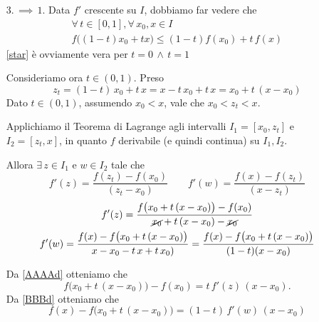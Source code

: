 {\begin{itemize}
    Allora abbiamo che \begin{gather*}
        f'(x_0)\le \frac{f(x)-f(x_0)}{x-x_0}\\
        f(x_0)-f(x)\ge f'(x)(x_0-x) \,\implies\, f(x)-f(x_0)\le f'(x)(x-x_0).
    \end{gather*}
    Otteniamo quindi, dalla seconda equazione: \begin{gather*}
        f'(x)\ge \frac{f(x)-f(x_0)}{x-x_0}\\
        f'(x_0)\le \frac{f(x)-f(x_0)}{x-x_0}\le f'(x).
    \end{gather*}
    
    
    Allora per $ x<x_0 $ generico in $ I $ si ha \[
        f'(x_0)\le f'(x)
    \] 
    
    $\implies$ per genericità di $ x_0, x \in I $, $ x<x_0 $, $ f' $ è crescente su $ I $.
    \item [$3. \,\implies\, 1.$] Data $ f' $ crescente su $ I $, dobbiamo far vedere che \begin{multline}
        \forall\, t \in [0,1], \forall\, x_0,x \in I \\
        f\bigl((1-t)x_0+tx\bigr)\le (1-t)f(x_0)+t\,f(x)\label{star}
    \end{multline}
        \eqref{star} è ovviamente vera per $ t=0\,\land\,t=1 $

        Consideriamo ora $ t \in(0,1)  $. Preso \[z_{t}=(1-t)\,x_0+t\,x=x-t\,x_0+t\,x=x_0+t\,(x-x_0)\]
        Dato $ t \in (0,1) $, assumendo $ x_0<x $, vale che $ x_0<z_{t}<x  $.

        Applichiamo il Teorema di Lagrange agli intervalli $ I_1=[x_0, z_{t}] $ e $ I_2=[z_{t}, x  ] $, in quanto $ f $ derivabile (e quindi continua) su $ I_1, I_2 $.

        Allora $ \exists \, z \in I_1 $ e $ w \in I_2  $ tale che \[
            f'(z)=\frac{f(z_{t})-f(x_0)}{(z_{t}-x_0 )}\qquad f'(w)=\frac{f(x)-f(z_{t} )}{(x-z_{t} )}
        \]
        \begin{gather}
            f'(z)= \frac{f\bigl(x_0+t\,(x-x_0)\bigr)-f(x_0)}{\cancel{x_0}+t\,(x-x_0)-\cancel{x_0}}\label{AAAAd}\\
            f'(w)=\frac{f(x)-f\bigl(x_0+t\,(x-x_0)\bigr)}{x-x_0-t\,x+t\,x_0)}=\frac{f(x)-f\bigl(x_0+t\,(x-x_0)\bigr)}{(1-t)(x-x_0)}\label{BBBd}
        \end{gather}

        Da \eqref{AAAAd} otteniamo che \begin{equation}
            f\bigl(x_0+t\,(x-x_0)\bigr)-f(x_0)=t\,f'(z)\,(x-x_0).\label{etereum}
        \end{equation}
        Da \eqref{BBBd} otteniamo che \begin{equation}
            f(x)-f\bigl(x_0+t\,(x-x_0)\bigr)=(1-t)\,f'(w)\,(x-x_0)\label{eterumd}
        \end{equation}


\end{itemize}}
